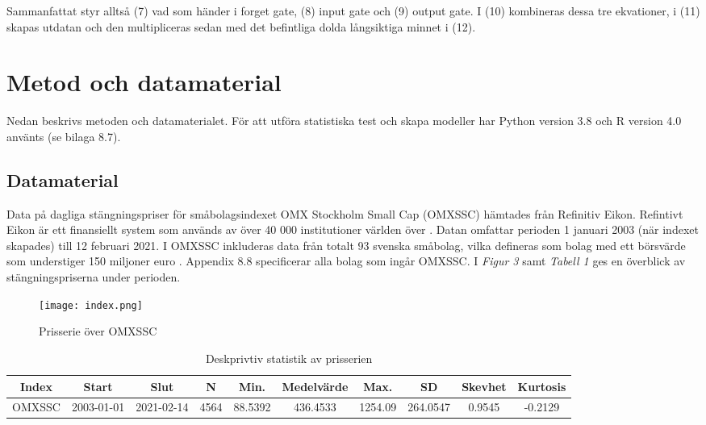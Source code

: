 \documentclass[11pt]{article}
\begin{document}
Sammanfattat styr alltså (7) vad som händer i forget gate, (8) input gate och (9) output gate. I (10) kombineras dessa tre ekvationer, i (11) skapas utdatan och den multipliceras sedan med det befintliga dolda långsiktiga minnet i (12). 

\section{Metod och datamaterial}
Nedan beskrivs metoden och datamaterialet. För att utföra statistiska test och skapa modeller har Python version 3.8 och R version 4.0 använts (se bilaga 8.7). 

\subsection{Datamaterial}

Data på dagliga stängningspriser för småbolagsindexet OMX Stockholm Small Cap (OMXSSC) hämtades från Refinitiv Eikon. Refintivt Eikon är ett finansiellt system som används av över 40 000 institutioner världen över \parencite{Eikon}. Datan omfattar perioden 1 januari 2003 (när indexet skapades) till 12 februari 2021. I OMXSSC inkluderas data från totalt 93 svenska småbolag, vilka defineras som bolag med ett börsvärde som understiger 150 miljoner euro \parencite{smabalagsdefinition}. Appendix 8.8 specificerar alla bolag som ingår OMXSSC. I \emph{Figur 3} samt \textit{Tabell 1} ges en överblick av stängningspriserna under perioden. 

\begin{figure}[H]
\caption{Prisserie över OMXSSC}
\texttt{[image: index.png]}
\centering
\end{figure}

\begin{table}[H]
\caption{Deskprivtiv statistik av prisserien}
\begin{adjustbox}{width=1\textwidth}
\begin{tabular}{|c|c|c|c|c|c|c|c|c|c|}
\hline
Index & Start & Slut & N & Min. & Medelvärde & Max. & SD & Skevhet & Kurtosis \\ \hline
OMXSSC   & 2003-01-01 & 2021-02-14 & 4564 & 88.5392  & 436.4533 & 1254.09 & 264.0547 & 0.9545 & -0.2129 \\ \hline
\end{tabular}
\end{adjustbox}
\end{table}
\end{document}
